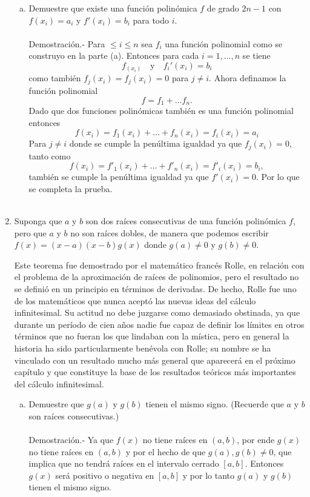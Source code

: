 \begin{enumerate}[\bfseries 1.]
\begin{enumerate}[(a)]
	     \item Demuestre que existe una función polinómica $f$ de grado $2n-1$ con $f(x_i)=a_i$ y $f'(x_i)=b_i$ para todo $i$.\\\\
		 Demostración.-\; Para $\leq i \leq n$ sea $f_i$ una función polinomial como se construyo en la parte (a). Entonces para cada $i=1,\ldots,n$ se tiene
		 $$f_(x_i)\quad \mbox{y}\quad f_i'(x_i)=b_i$$
		 como también $f_j(x_i)=f_j(x_i)=0$ para $j\neq i$. Ahora definamos la función polinomial
		 $$f=f_1+\ldots f_n.$$
		 Dado que dos funciones polinómicas también es una función polinomial entonces
		 $$f(x_i)=f_1(x_i)+\ldots + f_n(x_i)=f_i(x_i)=a_i$$
		 Para $j\neq i$ donde se cumple la penúltima igualdad ya que $f_j(x_i)=0$, tanto como
		 $$f(x_i)=f'_1(x_i)+\ldots + f'_n(x_i)=f'_i(x_i)=b_i,$$
		 también se cumple la penúltima igualdad ya que $f'(x_i)=0$. Por lo que se completa la prueba.\\\\
	    
	 \end{enumerate}

     \item Suponga que $a$ y $b$ son dos raíces consecutivas de una función polinómica $f$, pero que $a$ y $b$ no son raíces dobles, de manera que podemos escribir $f(x)=(x-a)(x-b)g(x)$ donde $g(a)\neq 0$ y $g(b)\neq 0.$

     Este teorema fue demostrado por el matemático francés Rolle, en relación con el problema de la aproximación de raíces de polinomios, pero el resultado no se definió en un principio en términos de derivadas. De hecho, Rolle fue uno de los matemáticos que nunca aceptó las nuevas ideas del cálculo infinitesimal. Su actitud no debe juzgarse como demasiado obstinada, ya que durante un período de cien años nadie fue capaz de definir los límites en otros términos que no fueran los que lindaban con la mística, pero en general la historia ha sido particularmente benévola con Rolle; su nombre se ha vinculado con un resultado mucho más general que aparecerá en el próximo capítulo y que constituye la base de los resultados teóricos más importantes del cálculo infinitesimal.

	 \begin{enumerate}[(a)]

	     \item Demuestre que $g(a)$ y $g(b)$ tienen el mismo signo. (Recuerde que $a$ y $b$ son raíces consecutivas.)\\\\
		 Demostración.-\; Ya que $f(x)$ no tiene raíces en $(a,b)$, por ende $g(x)$ no tiene raíces en $(a,b)$ y por el hecho de que $g(a),g(b)\neq 0$, que implica que no tendrá raíces en el intervalo cerrado $[a,b]$. Entonces $g(x)$ será positivo o negativa en $[a,b]$ y por lo tanto $g(a)$ y $g(b)$ tienen el mismo signo.\\\\


\end{enumerate}
\end{enumerate}
